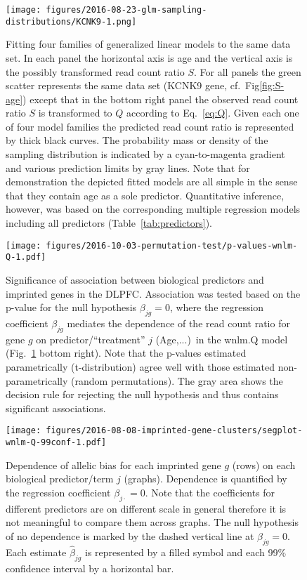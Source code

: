 \documentclass[letterpaper]{article}
\begin{document}
\begin{figure}[h]
\begin{center}
\texttt{[image: figures/2016-08-23-glm-sampling-distributions/KCNK9-1.png]}
\end{center}
\caption{Fitting four families of generalized linear models to the same data
set.  In each panel the horizontal axis is age and the vertical axis is the
possibly transformed read count ratio \(S\).  For all panels the green scatter
represents the same data set (KCNK9 gene, cf.~Fig\ref{fig:S-age})
except that in the bottom right panel the observed read count ratio \(S\) is
transformed to \(Q\) according to Eq.~\ref{eq:Q}.  Given each one of four model
families the predicted read count ratio is represented by thick black curves.
The probability mass or density of the sampling distribution is indicated by a
cyan-to-magenta gradient and various prediction limits by gray lines.  Note
that for demonstration the depicted fitted models are all simple in the sense
that they contain age as a sole predictor.  Quantitative inference, however,
was based on the corresponding multiple regression models including all
predictors (Table~\ref{tab:predictors}).
  }
\label{fig:predicted-curves}
\end{figure}

\begin{figure}[h]
\begin{center}
\texttt{[image: figures/2016-10-03-permutation-test/p-values-wnlm-Q-1.pdf]}
\end{center}
\caption{
Significance of association between biological predictors and imprinted genes
in the DLPFC.  Association was tested based on the p-value for the null
hypothesis \(\beta_{jg}=0\), where the regression coefficient \(\beta_{jg}\)
mediates the dependence of the read count ratio for gene \(g\) on
predictor/``treatment'' \(j\) (Age,...)~in the wnlm.Q model
(Fig.~\ref{fig:predicted-curves} bottom right).  Note that the p-values
estimated parametrically (t-distribution) agree well with those estimated
non-parametrically (random permutations).  The gray area shows the decision
rule for rejecting the null hypothesis and thus contains significant
associations.
}
\label{fig:pval-wnlm.Q}
\end{figure}

\begin{figure}[h]
\begin{center}
\texttt{[image: figures/2016-08-08-imprinted-gene-clusters/segplot-wnlm-Q-99conf-1.pdf]}
\end{center}
\caption{ 
Dependence of allelic bias for each imprinted gene \(g\) (rows)
on each biological predictor/term \(j\) (graphs).  Dependence is quantified by the regression coefficient
\(\beta_{j\cdot} = 0\).  Note that the coefficients for different predictors
are on different scale in general therefore it is not meaningful to compare them across
graphs.  The null hypothesis of no dependence is marked by the dashed
vertical line at \(\beta_{jg}=0\).  Each estimate \(\hat{\beta}_{jg}\) is
represented by a filled symbol and each 99\% confidence interval by a horizontal
bar.
}
\label{fig:biol-effects-wnlm.Q}
\end{figure}
\end{document}
